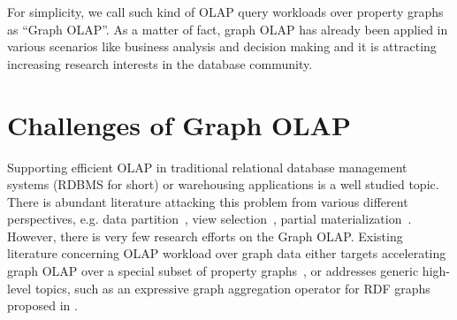 

For simplicity, we call such kind of OLAP query workloads over property graphs as ``Graph OLAP''. As a matter of fact, graph OLAP has already been applied in various scenarios like business analysis and decision making and it is attracting increasing research interests in the database community.



\section{Challenges of Graph OLAP}


Supporting efficient OLAP in traditional relational database management systems (RDBMS for short) \cite{DBLP:reference/db/2009} or warehousing applications is a well studied topic. There is abundant literature attacking this problem from various different perspectives, e.g. data partition~\cite{DBLP:conf/ismis/CuzzocreaL12}, view selection~\cite{DBLP:books/igi/Taniar10/LawrenceR10}, partial materialization~\cite{DBLP:journals/kais/DrzadzewskiT16}. However, there is very few research efforts on the Graph OLAP. Existing literature concerning OLAP workload over graph data either targets accelerating graph OLAP over a special subset of property graphs~\cite{DBLP:conf/sigmod/ZhaoLXH11}, or addresses generic high-level topics, such as an expressive graph aggregation operator for RDF graphs proposed in \cite{DBLP:conf/esws/MaaliCD15}. 


